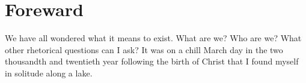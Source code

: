 \chapter{Foreward}

We have all wondered what it means to exist. What are we? Who are we? What other rhetorical questions
can I ask? It was on a chill March day in the two thousandth and twentieth year following the birth of Christ
that I found myself in solitude along a lake.
